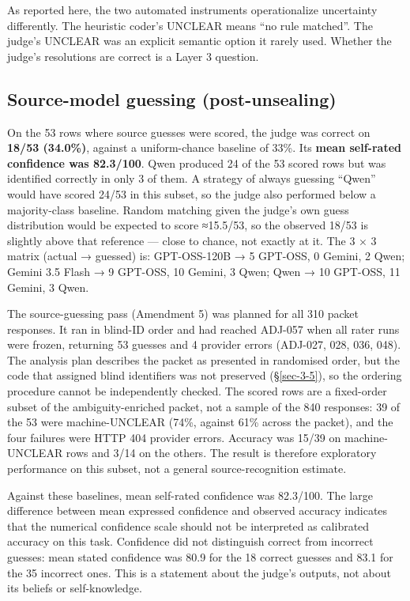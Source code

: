 \documentclass[11pt]{article}
\begin{document}
As reported here, the two automated instruments operationalize uncertainty differently. The heuristic coder's UNCLEAR means ``no rule matched''. The judge's UNCLEAR was an explicit semantic option it rarely used. Whether the judge's resolutions are correct is a Layer 3 question.

\hypertarget{sec-5-6}{%
\subsection{Source-model guessing (post-unsealing)}\label{sec-5-6}}

On the 53 rows where source guesses were scored, the judge was correct on \textbf{18/53 (34.0\%)}, against a uniform-chance baseline of 33\%. Its \textbf{mean self-rated confidence was 82.3/100}. Qwen produced 24 of the 53 scored rows but was identified correctly in only 3 of them. A strategy of always guessing ``Qwen'' would have scored 24/53 in this subset, so the judge also performed below a majority-class baseline. Random matching given the judge's own guess distribution would be expected to score ≈15.5/53, so the observed 18/53 is slightly above that reference --- close to chance, not exactly at it. The 3 × 3 matrix (actual → guessed) is: GPT-OSS-120B → 5 GPT-OSS, 0 Gemini, 2 Qwen; Gemini 3.5 Flash → 9 GPT-OSS, 10 Gemini, 3 Qwen; Qwen → 10 GPT-OSS, 11 Gemini, 3 Qwen.

The source-guessing pass (Amendment 5) was planned for all 310 packet responses. It ran in blind-ID order and had reached ADJ-057 when all rater runs were frozen, returning 53 guesses and 4 provider errors (ADJ-027, 028, 036, 048). The analysis plan describes the packet as presented in randomised order, but the code that assigned blind identifiers was not preserved (§\ref{sec-3-5}), so the ordering procedure cannot be independently checked. The scored rows are a fixed-order subset of the ambiguity-enriched packet, not a sample of the 840 responses: 39 of the 53 were machine-UNCLEAR (74\%, against 61\% across the packet), and the four failures were HTTP 404 provider errors. Accuracy was 15/39 on machine-UNCLEAR rows and 3/14 on the others. The result is therefore exploratory performance on this subset, not a general source-recognition estimate.

Against these baselines, mean self-rated confidence was 82.3/100. The large difference between mean expressed confidence and observed accuracy indicates that the numerical confidence scale should not be interpreted as calibrated accuracy on this task. Confidence did not distinguish correct from incorrect guesses: mean stated confidence was 80.9 for the 18 correct guesses and 83.1 for the 35 incorrect ones. This is a statement about the judge's outputs, not about its beliefs or self-knowledge.
\end{document}
